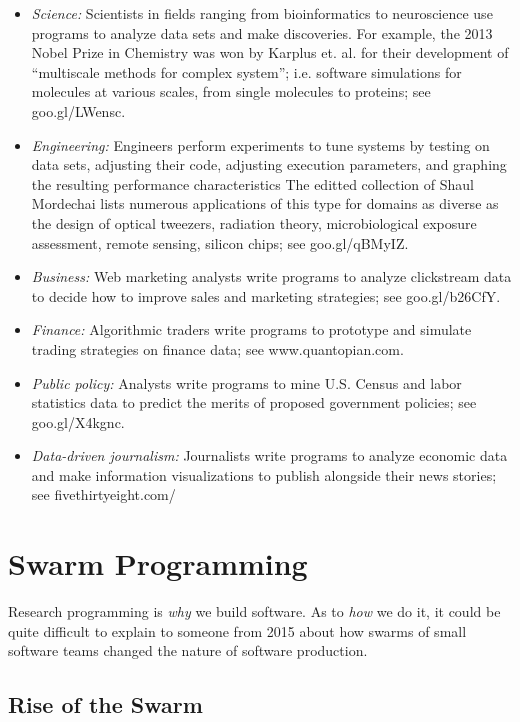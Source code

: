 \documentclass[journal]{IEEEtran}
\newcommand{\bi}{\begin{itemize}}
\newcommand{\ei}{\end{itemize}}
\begin{document}
\bi
\item 
{\em Science:} Scientists in fields ranging from bioinformatics to neuroscience use programs to analyze data sets and make  discoveries.
For example, the 2013 Nobel Prize in Chemistry was won by Karplus et. al. for their development of ``multiscale methods for complex system'';
i.e. software simulations for molecules at various scales, from single molecules to proteins; see goo.gl/LWensc.
\item
{\em Engineering:} Engineers perform experiments to tune systems by testing on data sets, adjusting their code, adjusting execution parameters, and graphing the resulting performance characteristics The editted collection of Shaul Mordechai lists numerous applications of this type for domains as diverse as the design of optical tweezers, radiation theory, microbiological exposure assessment, remote sensing, silicon chips; see  goo.gl/qBMyIZ.
\item
{\em Business:} Web marketing analysts write programs to analyze clickstream data to decide how to improve sales and marketing strategies; see  goo.gl/b26CfY.
\item
{\em Finance:} Algorithmic traders write programs to prototype and simulate  trading strategies on finance data; see  www.quantopian.com.
\item
{\em Public policy:} Analysts write programs to mine U.S. Census and labor statistics data to predict the merits of proposed government policies; see goo.gl/X4kgnc.
\item
{\em Data-driven journalism: }Journalists write programs to analyze economic data and make information visualizations to publish alongside their news stories; 
see fivethirtyeight.com/
\ei


\section{Swarm Programming}
Research programming is {\em why} we build software.
As to {\em how} we do it, it  could be quite difficult
to explain to someone from 2015 about how swarms of small software teams
changed the nature of software production.

\subsection{Rise of the Swarm}
\end{document}
